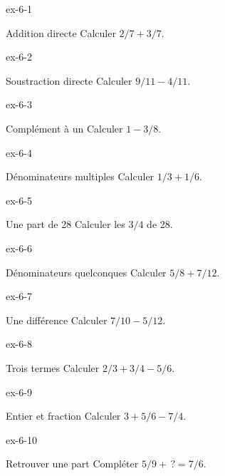 \clearpage{}
\begin{blocLivre}{ex-6-1}\begin{exercice}[1]{Addition directe}
Calculer $2/7+3/7$.
\end{exercice}\end{blocLivre}
\begin{blocLivre}{ex-6-2}\begin{exercice}[1]{Soustraction directe}
Calculer $9/11-4/11$.
\end{exercice}\end{blocLivre}
\begin{blocLivre}{ex-6-3}\begin{exercice}[1]{Complément à un}
Calculer $1-3/8$.
\end{exercice}\end{blocLivre}
\begin{blocLivre}{ex-6-4}\begin{exercice}[1]{Dénominateurs multiples}
Calculer $1/3+1/6$.
\end{exercice}\end{blocLivre}
\begin{blocLivre}{ex-6-5}\begin{exercice}[1]{Une part de 28}
Calculer les $3/4$ de 28.
\end{exercice}\end{blocLivre}

\begin{blocLivre}{ex-6-6}\begin{exercice}[2]{Dénominateurs quelconques}
Calculer $5/8+7/12$.
\end{exercice}\end{blocLivre}
\begin{blocLivre}{ex-6-7}\begin{exercice}[2]{Une différence}
Calculer $7/10-5/12$.
\end{exercice}\end{blocLivre}
\begin{blocLivre}{ex-6-8}\begin{exercice}[2]{Trois termes}
Calculer $2/3+3/4-5/6$.
\end{exercice}\end{blocLivre}
\begin{blocLivre}{ex-6-9}\begin{exercice}[2]{Entier et fraction}
Calculer $3+5/6-7/4$.
\end{exercice}\end{blocLivre}
\begin{blocLivre}{ex-6-10}\begin{exercice}[2]{Retrouver une part}
Compléter $5/9+\,?=7/6$.
\end{exercice}\end{blocLivre}

